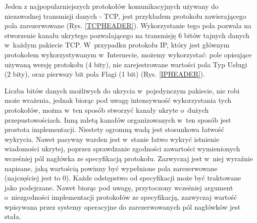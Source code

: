 \documentclass[a4paper, twoside, 12pt]{report}
\begin{document}
        Jeden z najpopularniejszych protokołów komunikacyjnych używany do niezawodnej
        transmisji danych - TCP, jest przykładem protokołu zawierającego pola zarezerwowane (Rys. \ref{TCPHEADER}).
        Wykorzystanie tego pola pozwala na stworzenie kanału ukrytego pozwalającego
        na transmisję 6 bitów tajnych danych w~każdym pakiecie TCP. W~przypadku protokołu
        IP, który jest głównym protokołem wykorzystywanym w~Internecie, możemy wykorzystać: pole
        opisujące używaną wersję protokołu (4 bity), nie zarejestrowane wartości pola Typ Usługi (2 bity),
        oraz pierwszy bit pola Flagi (1 bit) (Rys. \ref{IPHEADER})\cite{IPRFC}.

        Liczba bitów danych
        możliwych do ukrycia w~pojedynczym pakiecie, nie robi może wrażenia, jednak biorąc
        pod uwagę intensywność wykorzystania tych protokołów, można w~ten sposób
        stworzyć kanały ukryte o~dużych przepustowościach. Inną zaletą kanałów organizowanych
        w~ten sposób jest prostota implementacji. Niestety ogromną wadą jest stosunkowa
        łatwość wykrycia. Nawet pasywny warden jest w~stanie łatwo wykryć istnienie wiadomości
        ukrytej, poprzez sprawdzanie zgodności zawartości wymienionych wcześniej pól
        nagłówka ze specyfikacją protokołu. Zazwyczaj jest w~niej wyraźnie napisane,
        jaką wartością powinny być wypełnione pola zarezerwowane (najczęściej jest to 0).
        Każde odstępstwo od specyfikacji może być traktowane jako podejrzane. Nawet biorąc
        pod uwagę, przytoczony wcześniej argument o~niezgodności implementacji protokołów
        ze specyfikacją, zazwyczaj wartość wpisywana przez systemy operacyjne do
        zarezerwowanych pól nagłówków jest stała.
\end{document}
